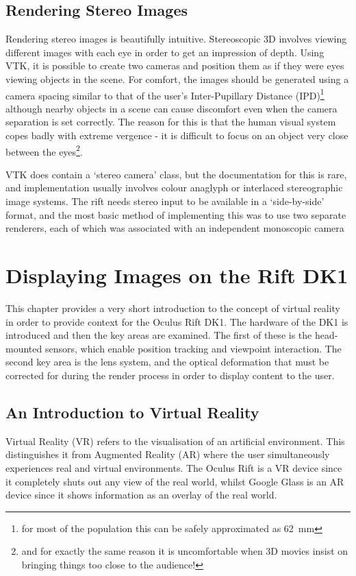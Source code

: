 \documentclass[MSc,paper=a4,pagesize=auto]{icldt}
\begin{document}
\section{Rendering Stereo Images}
Rendering stereo images is beautifully intuitive. Stereoscopic 3D involves viewing different images with each eye in order to get an impression of depth. Using VTK, it is possible to create two cameras and position them as if they were eyes viewing objects in the scene. For comfort, the images should be generated using a camera spacing similar to that of the user's Inter-Pupillary Distance (IPD)\footnote{for most of the population this can be safely approximated as \SI{62}{\mm}} although nearby objects in a scene can cause discomfort even when the camera separation is set correctly. The reason for this is that the human visual system copes badly with extreme vergence - it is difficult to focus on an object very close between the eyes\footnote{and for exactly the same reason it is uncomfortable when 3D movies insist on bringing things too close to the audience!}. 

VTK does contain a `stereo camera' class, but the documentation for this is rare, and implementation usually involves colour anaglyph or interlaced stereographic image systems. The rift needs stereo input to be available in a `side-by-side' format, and the most basic method of implementing this was to use two separate renderers, each of which was associated with an independent monoscopic camera 


\chapter{Displaying Images on the Rift DK1}
This chapter provides a very short introduction to the concept of virtual reality in order to provide context for the Oculus Rift DK1. The hardware of the DK1 is introduced and then the key areas are examined. The first of these is the head-mounted sensors, which enable position tracking and viewpoint interaction. The second key area is the lens system, and the optical deformation that must be corrected for during the render process in order to display content to the user. 

\section{An Introduction to Virtual Reality}
Virtual Reality (VR) refers to the visualisation of an artificial environment. This distinguishes it from Augmented Reality (AR) where the user simultaneously experiences real and virtual environments. The Oculus Rift is a VR device since it completely shuts out any view of the real world, whilst Google Glass is an AR device since it shows information as an overlay of the real world.
\end{document}
